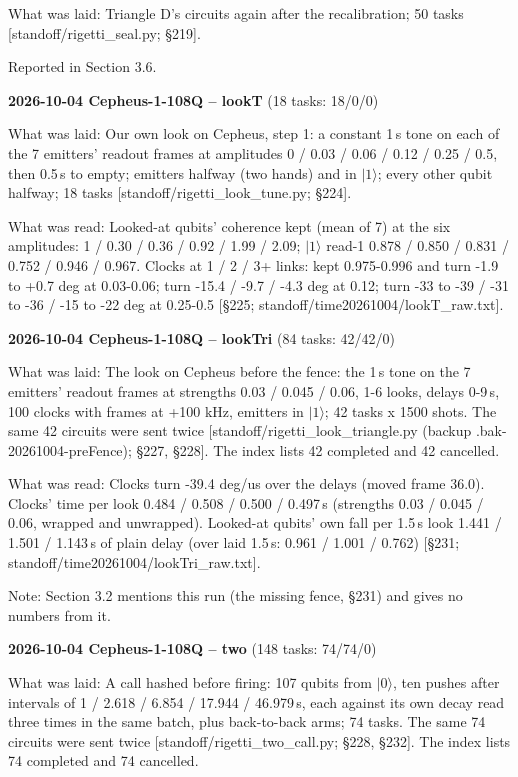 \documentclass[11pt]{article}
\begin{document}
What was laid: Triangle D's circuits again after the recalibration; 50 tasks {[}standoff/rigetti\_seal.py; \S{}219{]}.

Reported in Section 3.6.

\textbf{2026-10-04 Cepheus-1-108Q -- lookT} (18 tasks: 18/0/0)

What was laid: Our own look on Cepheus, step 1: a constant 1\,\textmu s tone on each of the 7 emitters' readout frames at amplitudes 0 / 0.03 / 0.06 / 0.12 / 0.25 / 0.5, then 0.5\,\textmu s to empty; emitters halfway (two hands) and in \(|1\rangle\); every other qubit halfway; 18 tasks {[}standoff/rigetti\_look\_tune.py; \S{}224{]}.

What was read: Looked-at qubits' coherence kept (mean of 7) at the six amplitudes: 1 / 0.30 / 0.36 / 0.92 / 1.99 / 2.09; \(|1\rangle\) read-1 0.878 / 0.850 / 0.831 / 0.752 / 0.946 / 0.967. Clocks at 1 / 2 / 3+ links: kept 0.975-0.996 and turn -1.9 to +0.7 deg at 0.03-0.06; turn -15.4 / -9.7 / -4.3 deg at 0.12; turn -33 to -39 / -31 to -36 / -15 to -22 deg at 0.25-0.5 {[}\S{}225; standoff/time20261004/lookT\_raw.txt{]}.

\textbf{2026-10-04 Cepheus-1-108Q -- lookTri} (84 tasks: 42/42/0)

What was laid: The look on Cepheus before the fence: the 1\,\textmu s tone on the 7 emitters' readout frames at strengths 0.03 / 0.045 / 0.06, 1-6 looks, delays 0-9\,\textmu s, 100 clocks with frames at +100 kHz, emitters in \(|1\rangle\); 42 tasks x 1500 shots. The same 42 circuits were sent twice {[}standoff/rigetti\_look\_triangle.py (backup .bak-20261004-preFence); \S{}227, \S{}228{]}. The index lists 42 completed and 42 cancelled.

What was read: Clocks turn -39.4 deg/us over the delays (moved frame 36.0). Clocks' time per look 0.484 / 0.508 / 0.500 / 0.497\,\textmu s (strengths 0.03 / 0.045 / 0.06, wrapped and unwrapped). Looked-at qubits' own fall per 1.5\,\textmu s look 1.441 / 1.501 / 1.143\,\textmu s of plain delay (over laid 1.5\,\textmu s: 0.961 / 1.001 / 0.762) {[}\S{}231; standoff/time20261004/lookTri\_raw.txt{]}.

Note: Section 3.2 mentions this run (the missing fence, \S{}231) and gives no numbers from it.

\textbf{2026-10-04 Cepheus-1-108Q -- two} (148 tasks: 74/74/0)

What was laid: A call hashed before firing: 107 qubits from \(|0\rangle\), ten pushes after intervals of 1 / 2.618 / 6.854 / 17.944 / 46.979\,\textmu s, each against its own decay read three times in the same batch, plus back-to-back arms; 74 tasks. The same 74 circuits were sent twice {[}standoff/rigetti\_two\_call.py; \S{}228, \S{}232{]}. The index lists 74 completed and 74 cancelled.
\end{document}
